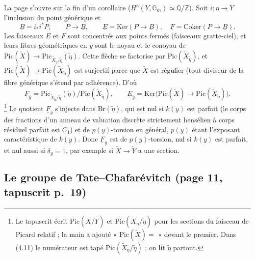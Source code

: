 \documentclass[11pt,a4paper]{article}
\begin{document}
La page s'ouvre sur la fin d'un corollaire ($H^{3}(Y,\mathbb{G}_{m}) \simeq
\mathbb{Q}/\mathbb{Z}$). Soit $i : \eta \to Y$ l'inclusion du point
générique et
\[
  \underline{B} = i_{*}i^{*}P, \qquad P \to \underline{B}, \qquad
  \underline{E} = \mathrm{Ker}(P \to \underline{B}), \quad
  \underline{F} = \mathrm{Coker}(P \to \underline{B}). \tag{4.8--4.10}
\]
Les faisceaux $\underline{E}$ et $\underline{F}$ sont concentrés aux points
fermés (faisceaux gratte-ciel), et leurs fibres géométriques en $\bar{y}$
sont le noyau et le conoyau de $\mathrm{Pic}(\widetilde{X}) \to
\mathrm{Pic}_{\widetilde{X}_{\tilde{\eta}}/\tilde{\eta}}(\tilde{\eta})$. Cette
flèche se factorise par $\mathrm{Pic}(\widetilde{X}_{\tilde{\eta}})$, et
$\mathrm{Pic}(\widetilde{X}) \to \mathrm{Pic}(\widetilde{X}_{\tilde{\eta}})$
est surjectif parce que $\widetilde{X}$ est régulier (tout diviseur de la
fibre générique s'étend par adhérence). D'où
\[
  \underline{F}_{\bar{y}} = \mathrm{Pic}_{\widetilde{X}_{\tilde{\eta}}/\tilde{\eta}}(\tilde{\eta})
  / \mathrm{Pic}(\widetilde{X}_{\tilde{\eta}}), \qquad
  \underline{E}_{\bar{y}} = \mathrm{Ker}\bigl(\mathrm{Pic}(\widetilde{X}) \to
  \mathrm{Pic}(\widetilde{X}_{\tilde{\eta}})\bigr). \tag{4.11--4.12}
\]
\footnote{Le tapuscrit écrit $\mathrm{Pic}(\widetilde{X}/\widetilde{Y})$ et
$\mathrm{Pic}(\widetilde{X}_{\tilde{\eta}}/\tilde{\eta})$ pour les sections
du faisceau de Picard relatif ; la main a ajouté « $\mathrm{Pic}(\widetilde{X})
=$ » devant le premier. Dans (4.11) le numérateur est tapé
$\mathrm{Pic}(\widetilde{X}_{\eta}/\tilde{\eta})$ ; on lit
$\tilde{\eta}$ partout.} Le quotient $\underline{F}_{\bar{y}}$ s'injecte dans
$\mathrm{Br}(\tilde{\eta})$, qui est nul si $k(y)$ est parfait (le corps des
fractions d'un anneau de valuation discrète strictement hensélien à corps
résiduel parfait est $C_{1}$) et de $p(y)$-torsion en général, $p(y)$ étant
l'exposant caractéristique de $k(y)$. Donc $\underline{F}_{\bar{y}}$ est de
$p(y)$-torsion, nul si $k(y)$ est parfait, et nul aussi si $\delta_{y} = 1$,
par exemple si $\widetilde{X} \to \widetilde{Y}$ a une section.

\subsection*{Le groupe de Tate--Chafarévitch (page 11, tapuscrit p.\ 19)}
\end{document}
